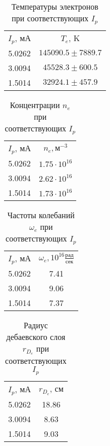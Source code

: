 \documentclass[a4paper]{article}
\begin{document}
            \begin{table}[h]
    \centering
        \begin{tabular}{|c|c|}
        \cline{1-2}
        $I_{p}$,  мА & $T_e$, K\\ \cline{1-2}
        5.0262 &  $145090.5\pm7889.7$\\ \cline{1-2}
        3.0094 &  $45528.3\pm600.5$\\ \cline{1-2}
        1.5014 &  $32924.1\pm457.9$\\ \cline{1-2}
        
        \end{tabular}
        \caption{Температуры электронов при соответствующих $I_p$}
        \label{tab:my_label}
    \end{table}

    \begin{table}[h]
    \centering
        \begin{tabular}{|c|c|}
        \cline{1-2}
        $I_{p}$,  мА & $n_e, \text{м}^{-3}$\\ \cline{1-2}
        5.0262 &  $1.75\cdot 10^16$\\ \cline{1-2}
        3.0094 &  $2.62\cdot 10^16$\\ \cline{1-2}
        1.5014 &  $1.73\cdot 10^16$\\ \cline{1-2}
        
        \end{tabular}
        \caption{Концентрации $n_e$ при соответствующих $I_p$}
        \label{tab:my_label}
    \end{table}

    \begin{table}[h]
    \centering
        \begin{tabular}{|c|c|}
        \cline{1-2}
        $I_{p}$,  мА & $\omega_e, 10^{16} \frac{\text{рад}}{\text{сек}}$\\ \cline{1-2}
        5.0262 &  7.41 \\ \cline{1-2}
        3.0094 &  9.06\\ \cline{1-2}
        1.5014 &  7.37\\ \cline{1-2}
        
        \end{tabular}
        \caption{Частоты колебаний $\omega_e$ при соответствующих $I_p$}
        \label{tab:my_label}
    \end{table}

        \begin{table}[h]
    \centering
        \begin{tabular}{|c|c|}
        \cline{1-2}
        $I_{p}$,  мА & $r_{D_e}$, см\\ \cline{1-2}
        5.0262 &  18.86 \\ \cline{1-2}
        3.0094 &  8.63\\ \cline{1-2}
        1.5014 &  9.03\\ \cline{1-2}
        
        \end{tabular}
        \caption{Радиус дебаевского слоя $r_{D_e}$ при соответствующих $I_p$}
        \label{tab:my_label}
    \end{table}
\end{document}
